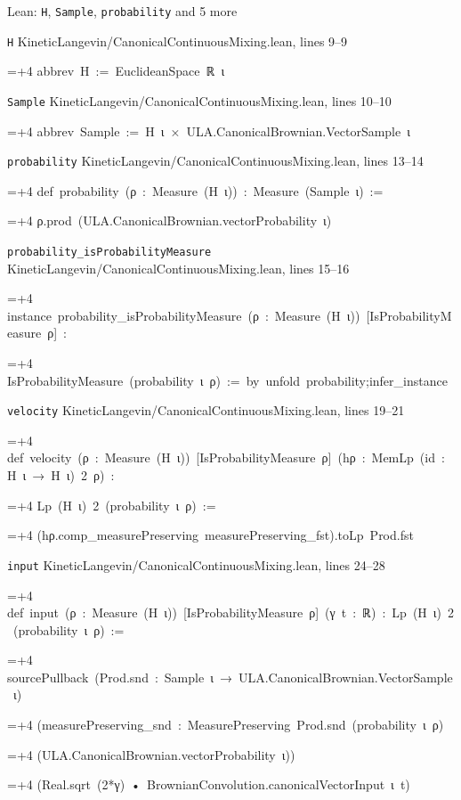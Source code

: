 \documentclass[11pt,a4paper]{article}
\newlength{\leancharwidth}
\newenvironment{leancode}{\par\smallskip\begingroup\ttfamily\footnotesize\raggedright
  \settowidth{\leancharwidth}{M}\setlength{\parskip}{0pt}\setlength{\parindent}{0pt}
  \frenchspacing}{\par\endgroup\smallskip}
\newcommand{\leanline}[2]{\hangindent=\dimexpr#1\leancharwidth+4\leancharwidth\relax
  \hangafter=1\noindent\hspace*{#1\leancharwidth}#2\par}
\newcommand{\leansource}[1]{\par{\footnotesize\color{leanmuted}#1}\par}
\begin{document}
\begin{leanbox}{Lean: \texttt{H}, \texttt{Sample}, \texttt{probability} and 5 more}
\leansource{\texttt{H} \quad KineticLangevin/\allowbreak{}CanonicalContinuousMixing.lean, lines 9–9}
\begin{leancode}
\leanline{0}{abbrev\ H\ :=\ EuclideanSpace\ ℝ\ ι}
\end{leancode}
\leansource{\texttt{Sample} \quad KineticLangevin/\allowbreak{}CanonicalContinuousMixing.lean, lines 10–10}
\begin{leancode}
\leanline{0}{abbrev\ Sample\ :=\ H\ ι\ ×\ ULA.CanonicalBrownian.VectorSample\ ι}
\end{leancode}
\leansource{\texttt{probability} \quad KineticLangevin/\allowbreak{}CanonicalContinuousMixing.lean, lines 13–14}
\begin{leancode}
\leanline{0}{def\ probability\ (ρ\ :\ Measure\ (H\ ι))\ :\ Measure\ (Sample\ ι)\ :=}
\leanline{2}{ρ.prod\ (ULA.CanonicalBrownian.vectorProbability\ ι)}
\end{leancode}
\leansource{\texttt{probability\_\allowbreak{}isProbabilityMeasure} \quad KineticLangevin/\allowbreak{}CanonicalContinuousMixing.lean, lines 15–16}
\begin{leancode}
\leanline{0}{instance\ probability\_isProbabilityMeasure\ (ρ\ :\ Measure\ (H\ ι))\ [IsProbabilityMeasure\ ρ]\ :}
\leanline{4}{IsProbabilityMeasure\ (probability\ ι\ ρ)\ :=\ by\ unfold\ probability;infer\_instance}
\end{leancode}
\leansource{\texttt{velocity} \quad KineticLangevin/\allowbreak{}CanonicalContinuousMixing.lean, lines 19–21}
\begin{leancode}
\leanline{0}{def\ velocity\ (ρ\ :\ Measure\ (H\ ι))\ [IsProbabilityMeasure\ ρ]\ (hρ\ :\ MemLp\ (id\ :\ H\ ι\ →\ H\ ι)\ 2\ ρ)\ :}
\leanline{4}{Lp\ (H\ ι)\ 2\ (probability\ ι\ ρ)\ :=}
\leanline{2}{(hρ.comp\_measurePreserving\ measurePreserving\_fst).toLp\ Prod.fst}
\end{leancode}
\leansource{\texttt{input} \quad KineticLangevin/\allowbreak{}CanonicalContinuousMixing.lean, lines 24–28}
\begin{leancode}
\leanline{0}{def\ input\ (ρ\ :\ Measure\ (H\ ι))\ [IsProbabilityMeasure\ ρ]\ (γ\ t\ :\ ℝ)\ :\ Lp\ (H\ ι)\ 2\ (probability\ ι\ ρ)\ :=}
\leanline{2}{sourcePullback\ (Prod.snd\ :\ Sample\ ι\ →\ ULA.CanonicalBrownian.VectorSample\ ι)}
\leanline{4}{(measurePreserving\_snd\ :\ MeasurePreserving\ Prod.snd\ (probability\ ι\ ρ)}
\leanline{6}{(ULA.CanonicalBrownian.vectorProbability\ ι))}
\leanline{4}{(Real.sqrt\ (2*γ)\ •\ BrownianConvolution.canonicalVectorInput\ ι\ t)}

\end{leancode}
\end{leanbox}
\end{document}
